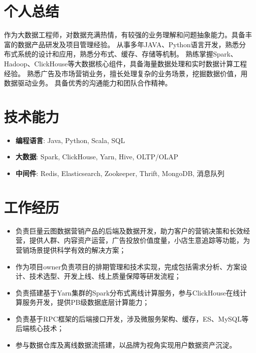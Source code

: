 \documentclass{resume}
\begin{document}

 
\section{个人总结}
作为大数据工程师，对数据充满热情，有较强的业务理解和问题抽象能力。具备丰富的数据产品研发及项目管理经验。
从事多年JAVA、Python语言开发，熟悉分布式系统的设计和应用，熟悉分布式、缓存、存储等机制。
熟练掌握Spark、Hadoop、ClickHouse等大数据核心组件，具备海量数据处理和实时数据计算工程经验。
熟悉广告及市场营销业务，擅长处理复杂的业务场景，挖掘数据价值，用数据驱动业务。
具备优秀的沟通能力和团队合作精神。

\section{技术能力}
\begin{itemize}[parsep=0.2ex]
  \item \textbf{编程语言}: Java, Python, Scala, SQL
  \item \textbf{大数据}: Spark, ClickHouse, Yarn, Hive, OLTP/OLAP
  \item \textbf{中间件}: Redis, Elasticsearch, Zookeeper, Thrift, MongoDB, 消息队列
\end{itemize}

\section{工作经历}
\begin{itemize}
  \item 负责巨量云图数据营销产品的后端及数据开发，助力客户的营销决策和长效经营，提供人群、内容资产运营，广告投放价值度量，小店生意追踪等功能，为营销场景提供科学有效的解决方案；
  \item 作为项目owner负责项目的排期管理和技术实现，完成包括需求分析、方案设计、技术选型、开发上线、线上质量保障等研发流程；
  \item 负责搭建基于Yarn集群的Spark分布式离线计算服务，参与ClickHouse在线计算服务开发，提供PB级数据底层计算能力；
  \item 负责基于RPC框架的后端接口开发，涉及微服务架构、缓存，ES、MySQL等后端核心技术；
  \item 参与数据仓库及离线数据流搭建，以品牌为视角实现用户数据资产沉淀。
\end{itemize}
\end{document}
